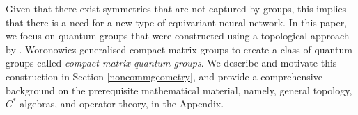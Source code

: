 \documentclass{article}
\theoremstyle{plain}
\theoremstyle{definition}
\theoremstyle{remark}
\begin{document}
Given that there exist symmetries that are not captured by groups,
this implies that there is a need for a new type of equivariant neural network.
In this paper, we 
focus on quantum groups that were constructed 
using a topological approach by \citet{woronowicz1987}.
Woronowicz generalised compact matrix groups 
to create a class of quantum groups
called 
\textit{compact matrix quantum groups}.
We describe and motivate this construction in Section \ref{noncommgeometry},
and provide a comprehensive background on the prerequisite mathematical material,
namely, general topology, $C^{*}$-algebras,
and operator theory, in the Appendix.
\end{document}
